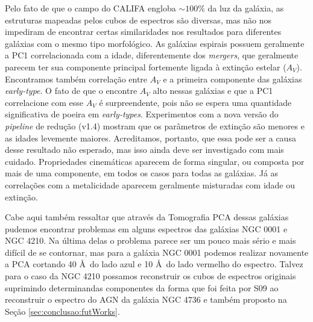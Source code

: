 Pelo fato de que o campo do CALIFA engloba $\sim100\%$ da luz da galáxia, as estruturas mapeadas pelos cubos de
espectros são diversas, mas não nos impediram de encontrar certas similaridades nos resultados para diferentes galáxias
com o mesmo tipo morfológico. As galáxias espirais possuem geralmente a PC1 correlacionada com a idade, diferentemente
dos {\em mergers}, que geralmente parecem ter sua componente principal fortemente ligada à extinção estelar ($A_V$).
Encontramos também correlação entre $A_V$ e a primeira componente das galáxias {\em early-type}. O fato de que o
\starlight encontre $A_V$ alto nessas galáxias e que a PC1 correlacione com esse $A_V$ é surpreendente, pois não se
espera uma quantidade significativa de poeira em {\em early-types}. Experimentos com a nova versão do {\em pipeline}
de redução (v1.4) mostram que os parâmetros de extinção são menores e as idades levemente maiores. Acreditamos,
portanto, que essa pode ser a causa desse resultado não esperado, mas isso ainda deve ser investigado com mais
cuidado. Propriedades cinemáticas aparecem de forma singular, ou composta por mais de uma componente, em todos os
casos para todas as galáxias. Já as correlações com a metalicidade aparecem geralmente misturadas com idade ou extinção.

Cabe aqui também ressaltar que através da Tomografia PCA dessas galáxias pudemos encontrar problemas em alguns espectros
das galáxias NGC 0001 e NGC 4210. Na última delas o problema parece ser um pouco mais sério e mais difícil de se
contornar, mas para a galáxia NGC 0001 podemos realizar novamente a PCA cortando 40 \AA\ do lado azul e 10 \AA\ do lado
vermelho do espectro. Talvez para o caso da NGC 4210 possamos reconstruir os cubos de espectros originais suprimindo
determinandas componentes da forma que foi feita por S09 ao reconstruir o espectro do AGN da galáxia NGC 4736 e também
proposto na Seção \ref{sec:conclusao:futWorks}.

